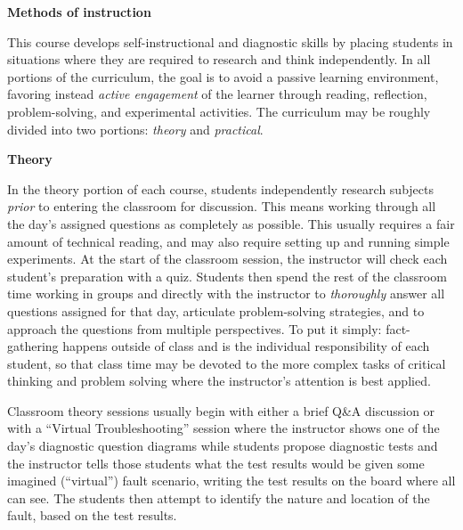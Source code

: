 


\centerline{\bf Methods of instruction}

\vskip 10pt

This course develops self-instructional and diagnostic skills by placing students in situations where they are required to research and think independently.  In all portions of the curriculum, the goal is to avoid a passive learning environment, favoring instead {\it active engagement} of the learner through reading, reflection, problem-solving, and experimental activities.  The curriculum may be roughly divided into two portions: {\it theory} and {\it practical}.

\vskip 30pt

\noindent
{\bf Theory}

In the theory portion of each course, students independently research subjects {\it prior} to entering the classroom for discussion.  This means working through all the day's assigned questions as completely as possible.  This usually requires a fair amount of technical reading, and may also require setting up and running simple experiments.  At the start of the classroom session, the instructor will check each student's preparation with a quiz.  Students then spend the rest of the classroom time working in groups and directly with the instructor to {\it thoroughly} answer all questions assigned for that day, articulate problem-solving strategies, and to approach the questions from multiple perspectives.  To put it simply: fact-gathering happens outside of class and is the individual responsibility of each student, so that class time may be devoted to the more complex tasks of critical thinking and problem solving where the instructor's attention is best applied.

Classroom theory sessions usually begin with either a brief Q\&A discussion or with a ``Virtual Troubleshooting'' session where the instructor shows one of the day's diagnostic question diagrams while students propose diagnostic tests and the instructor tells those students what the test results would be given some imagined (``virtual'') fault scenario, writing the test results on the board where all can see.  The students then attempt to identify the nature and location of the fault, based on the test results.

